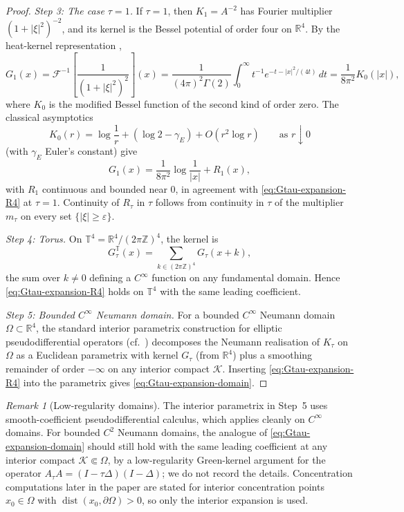 \documentclass[11pt,reqno]{amsart}
\theoremstyle{definition}
\theoremstyle{remark}
\newtheorem{remark}[theorem]{Remark}
\newcommand{\R}{\mathbb{R}}
\newcommand{\T}{\mathbb{T}}
\newcommand{\Z}{\mathbb{Z}}
\newcommand{\dist}{\operatorname{dist}}
\begin{document}
\begin{proof}
\emph{Step 3: The case $\tau=1$.}
If $\tau=1$, then $K_1=A^{-2}$ has Fourier multiplier $(1+|\xi|^{2})^{-2}$, and its kernel is the Bessel potential of order four on $\R^{4}$. By the heat-kernel representation \cite{stein1970singular},
\[
        G_1(x)
        =\mathcal{F}^{-1}\!\left[\frac{1}{(1+|\xi|^{2})^{2}}\right]\!(x)
        =\frac{1}{(4\pi)^{2}\Gamma(2)}\int_0^{\infty}t^{-1}e^{-t-|x|^{2}/(4t)}\,dt
        =\frac{1}{8\pi^{2}}K_0(|x|),
\]
where $K_0$ is the modified Bessel function of the second kind of order zero. The classical asymptotics
\[
        K_0(r)=\log\frac{1}{r}+(\log 2-\gamma_E)+O(r^{2}\log r)\qquad\text{as }r\downarrow 0
\]
(with $\gamma_E$ Euler's constant) give
\[
        G_1(x)=\frac{1}{8\pi^{2}}\log\frac{1}{|x|}+R_1(x),
\]
with $R_1$ continuous and bounded near $0$, in agreement with \eqref{eq:Gtau-expansion-R4} at $\tau=1$. Continuity of $R_\tau$ in $\tau$ follows from continuity in $\tau$ of the multiplier $m_\tau$ on every set $\{|\xi|\ge\varepsilon\}$.

\emph{Step 4: Torus.}
On $\T^{4}=\R^{4}/(2\pi\Z)^{4}$, the kernel is
\[
        G_\tau^{\T}(x)=\sum_{k\in(2\pi\Z)^{4}}G_\tau(x+k),
\]
the sum over $k\ne 0$ defining a $C^{\infty}$ function on any fundamental domain. Hence \eqref{eq:Gtau-expansion-R4} holds on $\T^{4}$ with the same leading coefficient.

\emph{Step 5: Bounded $C^{\infty}$ Neumann domain.}
For a bounded $C^{\infty}$ Neumann domain $\Omega\subset\R^{4}$, the standard interior parametrix construction for elliptic pseudodifferential operators (cf.~\cite{taylor2010pseudodifferential}) decomposes the Neumann realisation of $K_\tau$ on $\Omega$ as a Euclidean parametrix with kernel $G_\tau$ (from $\R^{4}$) plus a smoothing remainder of order $-\infty$ on any interior compact $\mathcal K$. Inserting \eqref{eq:Gtau-expansion-R4} into the parametrix gives \eqref{eq:Gtau-expansion-domain}.
\end{proof}

\begin{remark}[Low-regularity domains]\label{rem:boundary-low-regularity}
The interior parametrix in Step~5 uses smooth-coefficient pseudodifferential calculus, which applies cleanly on $C^{\infty}$ domains. For bounded $C^{2}$ Neumann domains, the analogue of \eqref{eq:Gtau-expansion-domain} should still hold with the same leading coefficient at any interior compact $\mathcal K\Subset\Omega$, by a low-regularity Green-kernel argument for the operator $A_\tau A=(I-\tau\Delta)(I-\Delta)$; we do not record the details. Concentration computations later in the paper are stated for interior concentration points $x_0\in\Omega$ with $\dist(x_0,\partial\Omega)>0$, so only the interior expansion is used.
\end{remark}
\end{document}
